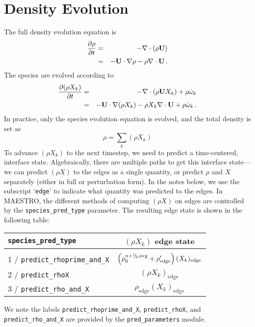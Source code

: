 
\section{Density Evolution}
The full density evolution equation is
\begin{eqnarray}
\frac{\partial\rho}{\partial t} &=& -\nabla\cdot(\rho{\bf U}) \nonumber \\
&=& -{\bf U}\cdot\nabla\rho - \rho\nabla\cdot{\bf U} \, . \label{rho equation}
\end{eqnarray}
The species are evolved according to
\begin{eqnarray}
\frac{\partial(\rho X_k)}{\partial t} &=& -\nabla\cdot(\rho{\bf U} X_k) + \rho \dot{\omega}_k \nonumber \\
&=& -{\bf U}\cdot\nabla(\rho X_k) - \rho X_k \nabla\cdot{\bf U} + \rho \dot{\omega}_k \, . \label{species equation}
\end{eqnarray}
In practice, only the species evolution equation is evolved, and the
total density is set as
\begin{equation}
\rho = \sum_k (\rho X_k)
\end{equation}
To advance $(\rho X_k)$ to the next timestep, we need to predict a
time-centered, interface state.  Algebraically, there are multiple
paths to get this interface state---we can predict $(\rho X)$ to the
edges as a single quantity, or predict $\rho$ and $X$ separately
(either in full or perturbation form).  In the notes below, we use the
subscript `{\tt edge}' to indicate what quantity was predicted to the
edges.  In MAESTRO, the different methods of computing $(\rho X)$ on
edges are controlled by the {\tt species\_pred\_type} parameter.  The
resulting edge state is shown in the following table:

\begin{table}[h]
\centering
\begin{tabular}{l|c}
\hline
\hline
{\tt species\_pred\_type} &   {$(\rho X_k)$ edge state} \\
\hline \\[-3mm]
1 / {\tt predict\_rhoprime\_and\_X}  &  $\left(\rho_0^{n+\myhalf,{\rm avg}}
+ \rho'_\mathrm{edge} \right)(X_k)_\mathrm{edge}$ \\[2mm]
2 / {\tt predict\_rhoX}  &  $(\rho X_k)_\mathrm{edge}$ \\[2mm]
3 / {\tt predict\_rho\_and\_X}  &  $\rho_\mathrm{edge} (X_k)_\mathrm{edge}$ \\
\hline
\end{tabular}
\end{table}
We note the labels {\tt predict\_rhoprime\_and\_X}, {\tt predict\_rhoX}, and
{\tt predict\_rho\_and\_X} are provided by the {\tt pred\_parameters}
module.



